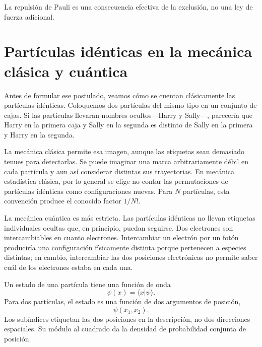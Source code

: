 La repulsión de Pauli es una consecuencia efectiva de la exclusión, no una ley de fuerza adicional.

\begin{classroomqa}
\end{classroomqa}

\section{Partículas idénticas en la mecánica clásica y cuántica}

Antes de formular ese postulado, veamos cómo se cuentan clásicamente las partículas idénticas. Coloquemos dos partículas del mismo tipo en un conjunto de cajas. Si las partículas llevaran nombres ocultos---Harry y Sally---, parecería que Harry en la primera caja y Sally en la segunda es distinto de Sally en la primera y Harry en la segunda.

La mecánica clásica permite esa imagen, aunque las etiquetas sean demasiado tenues para detectarlas. Se puede imaginar una marca arbitrariamente débil en cada partícula y aun así considerar distintas sus trayectorias. En mecánica estadística clásica, por lo general se elige no contar las permutaciones de partículas idénticas como configuraciones nuevas. Para \(N\) partículas, esta convención produce el conocido factor \(1/N!\).

La mecánica cuántica es más estricta. Las partículas idénticas no llevan etiquetas individuales ocultas que, en principio, puedan seguirse. Dos electrones son intercambiables en cuanto electrones. Intercambiar un electrón por un fotón produciría una configuración físicamente distinta porque pertenecen a especies distintas; en cambio, intercambiar las dos posiciones electrónicas no permite saber cuál de los electrones estaba en cada una.

Un estado de una partícula tiene una función de onda
\[
\psi(x)=\langle x\vert\psi\rangle.
\]
Para dos partículas, el estado es una función de dos argumentos de posición,
\begin{equation}
\psi(x_{1},x_{2}).
\end{equation}
Los subíndices etiquetan las dos posiciones en la descripción, no dos direcciones espaciales. Su módulo al cuadrado da la densidad de probabilidad conjunta de posición.

